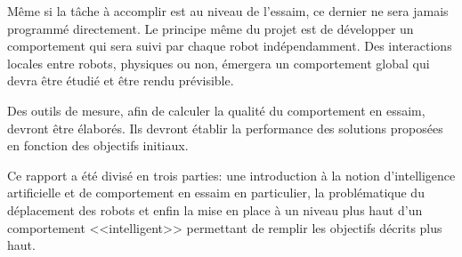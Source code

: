 Même si la tâche à accomplir est au niveau de l'essaim, ce dernier ne sera jamais programmé directement. Le principe même du projet est de développer un comportement qui sera suivi par chaque robot indépendamment. Des interactions locales entre robots, physiques ou non, émergera un comportement global qui devra être étudié et être rendu prévisible.

Des outils de mesure, afin de calculer la qualité du comportement en essaim, devront être élaborés. Ils devront établir la performance des solutions proposées en fonction des objectifs initiaux.~\cite{cahierCharges}

\vspace{1em}Ce rapport a été divisé en trois parties: une introduction à la notion d'intelligence artificielle et de comportement en essaim en particulier, la problématique du déplacement des robots et enfin la mise en place à un niveau plus haut d'un comportement <<intelligent>> permettant de remplir les objectifs décrits plus haut.